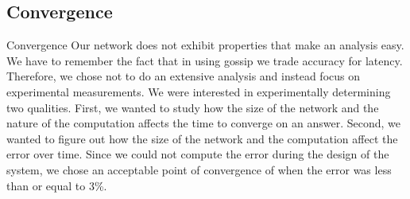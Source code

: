 \subsection{Convergence}
Convergence
Our network does not exhibit properties that make an analysis easy. We have to remember the fact that in using gossip we trade accuracy for latency. Therefore, we chose not to do an extensive analysis and instead focus on experimental measurements. We were interested in experimentally determining two qualities. First, we wanted to study how the size of the network and the nature of the computation affects the time to converge on an answer. Second, we wanted to figure out how the size of the network and the computation affect the error over time. Since we could not compute the error during the design of the system, we chose an acceptable point of convergence of when the error was less than or equal to 3\%. 
